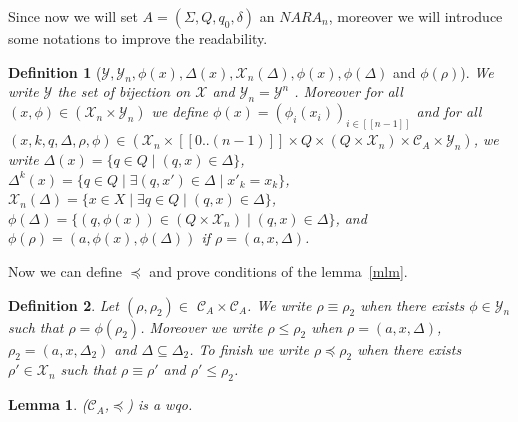\documentclass[a4paper,10pt]{report}
\newtheorem{lm}{Lemma}[thr]
\newtheorem{df}{Definition}
\newcommand{\seg}[1]{[\![#1]\!]}
\newcommand{\ts}{\seg{0 .. (n-1)}}
\newcommand{\C}{\mathcal{C}_{A}}
\newcommand{\Xa}{\mathcal{X}}
\newcommand{\X}{\mathcal{X}_{n}}
\newcommand{\Ya}{\mathcal{Y}}
\newcommand{\Y}{\mathcal{Y}_{n}}
\begin{document}
Since now we will set $A =(\Sigma ,Q ,q_0, \delta )$ an $NARA_n$, moreover we will introduce some notations to improve the readability.

\begin{df}[$\Ya, \Y, \phi(x),\Delta(x), \X(\Delta),\phi(x), \phi(\Delta)$ and $ \phi(\rho)$]
We write $\Ya$ the set of bijection on $\Xa$ and $\Y = \Ya^n$ .
Moreover for all $(x,\phi) \in (\X \times \Y)$ we define $\phi(x) = (\phi_i(x_i))_{i \in \seg{n-1}} $
and for all $(x,k,q,\Delta,\rho,\phi) \in (\X \times \ts \times Q \times (Q \times \X) \times \C \times \Y)$, we write 
$\Delta(x) = \{ q\in Q \mid (q,x) \in \Delta \}$,
$\Delta^k(x) = \{q \in Q \mid \exists  (q,x') \in \Delta \mid x'_k = x_k\}$,
$\X(\Delta) = \{ x\in X \mid \exists q\in Q \mid (q,x) \in \Delta \}$,
$\phi(\Delta) = \{ (q,\phi(x)) \in (Q \times \X) \mid (q,x) \in \Delta \}$,
and $\phi(\rho) = (a,\phi(x),\phi(\Delta))$ if $\rho = (a,x,\Delta)$.
\end{df}

Now we can define $\preceq$ and prove conditions of the lemma~\ref{mlm}.

\begin{df}
  Let $(\rho,\rho_2) \in$  $\C\times\C$.
  We write $\rho \equiv \rho_2$ when there exists $\phi \in \Y$ such that  $ \rho = \phi(\rho_2)$.    
  Moreover we write $\rho \leq \rho_2$ when $ \rho=(a ,x, \Delta  )$, $\rho_2=(a ,x, \Delta_2  )$ and $\Delta \subseteq \Delta_2$.
  To finish we write $\rho \preceq \rho_2$ when there exists $\rho' \in \X$ such that $\rho \equiv \rho'$ and $\rho' \leq \rho_2$.
\end{df}



\begin{lm} \label{cd1}
  ($\C$,$\preceq$) is a wqo.
\end{lm}
\end{document}
